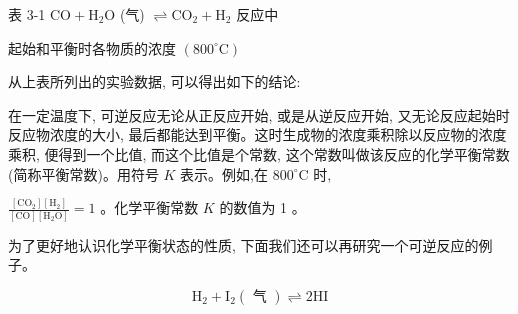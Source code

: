 \documentclass[10pt]{article}
\begin{document}
表 3-1 \(\mathrm{{CO}} + {\mathrm{H}}_{2}\mathrm{O}\) (气) \(\rightleftharpoons {\mathrm{{CO}}}_{2} + {\mathrm{H}}_{2}\) 反应中

起始和平衡时各物质的浓度 \(\left( {{800}^{ \circ }\mathrm{C}}\right)\)

\begin{center}
\end{center}

从上表所列出的实验数据, 可以得出如下的结论:

在一定温度下, 可逆反应无论从正反应开始, 或是从逆反应开始, 又无论反应起始时反应物浓度的大小, 最后都能达到平衡。这时生成物的浓度乘积除以反应物的浓度乘积, 便得到一个比值, 而这个比值是个常数, 这个常数叫做该反应的化学平衡常数 (简称平衡常数)。用符号 \(K\) 表示。例如,在 \({800}^{ \circ }\mathrm{C}\) 时,

\(\frac{\left\lbrack {\mathrm{{CO}}}_{2}\right\rbrack \left\lbrack {\mathrm{H}}_{2}\right\rbrack }{\left\lbrack \mathrm{{CO}}\right\rbrack \left\lbrack {{\mathrm{H}}_{2}\mathrm{O}}\right\rbrack } = 1\) 。化学平衡常数 \(K\) 的数值为 1 。

为了更好地认识化学平衡状态的性质, 下面我们还可以再研究一个可逆反应的例子。

\[
{\mathrm{H}}_{2} + {\mathrm{I}}_{2}\left( \text{ 气 }\right) \rightleftharpoons 2\mathrm{{HI}}
\]
\end{document}
